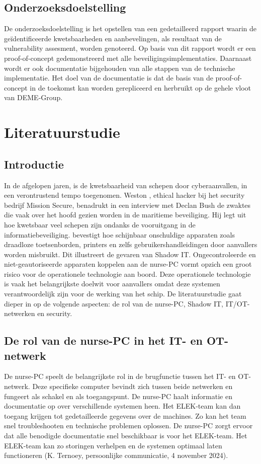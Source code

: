 \subsection{Onderzoeksdoelstelling}
De onderzoeksdoelstelling is het opstellen van een gedetailleerd rapport waarin de geïdentificeerde kwetsbaarheden en aanbevelingen, als resultaat van de vulnerability assesment, worden genoteerd.
Op basis van dit rapport wordt er een proof-of-concept gedemonstreerd met alle beveiligingsimplementaties.
Daarnaast wordt er ook documentatie bijgehouden van alle stappen van de technische implementatie.
Het doel van de documentatie is dat de basis van de proof-of-concept in de toekomst kan worden gerepliceerd en herbruikt op de gehele vloot van DEME-Group.



\section{Literatuurstudie}%
\label{sec:literatuurstudie}
\subsection{Introductie}
In de afgelopen jaren, is de kwetsbaarheid van schepen door cyberaanvallen, in een verontrustend tempo toegenomen. Weston \textcite{Hecker2021}, ethical hacker bij het security bedrijf 
Mission Secure, benadrukt in een interview met Declan Bush de zwaktes die vaak over het hoofd gezien worden in de maritieme beveiliging. Hij
legt uit hoe kwetsbaar veel schepen zijn ondanks de vooruitgang in de informatiebeveiliging. \textcite{Hecker2021} bevestigt hoe schijnbaar onschuldige apparaten zoals draadloze toetsenborden, printers en 
zelfs gebruikershandleidingen door aanvallers worden misbruikt. Dit illustreert de gevaren van Shadow IT.
Ongecontroleerde en niet-geautoriseerde apparaten koppelen aan de nurse-PC vormt opzich een groot risico voor de operationele technologie aan boord. 
Deze operationele technologie is vaak het belangrijkste doelwit voor aanvallers omdat deze systemen verantwoordelijk zijn voor de werking van het schip.
De literatuurstudie gaat dieper in op de volgende aspecten: de rol van de nurse-PC, Shadow IT, IT/OT-netwerken en security.

\subsection{De rol van de nurse-PC in het IT- en OT-netwerk} 
De nurse-PC speelt de belangrijkste rol in de brugfunctie tussen het IT- en OT-netwerk. Deze specifieke computer bevindt 
zich tussen beide netwerken en fungeert als schakel en als toegangspunt. De nurse-PC haalt informatie en documentatie op over verschillende systemen heen.
Het ELEK-team kan dan toegang krijgen tot gedetailleerde gegevens over de 
machines. Zo kan het team snel troubleshooten en technische problemen oplossen. De nurse-PC zorgt ervoor dat alle benodigde documentatie
snel beschikbaar is voor het ELEK-team. Het ELEK-team kan zo storingen
verhelpen en de systemen optimaal laten functioneren (K. Ternoey, persoonlijke communicatie, 4 november 2024).

